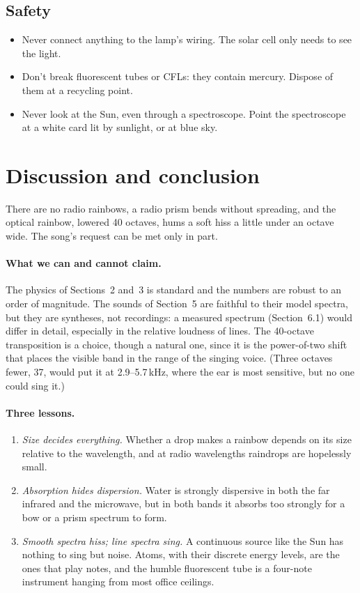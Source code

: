 \documentclass[11pt,a4paper]{article}
\begin{document}
\subsection{Safety}

\begin{itemize}
  \item Never connect anything to the lamp's wiring. The solar cell only needs to see the light.
  \item Don't break fluorescent tubes or CFLs: they contain mercury. Dispose of them at a recycling point.
  \item Never look at the Sun, even through a spectroscope. Point the spectroscope at a white card lit by sunlight, or at blue sky.
\end{itemize}

\section{Discussion and conclusion}

There are no radio rainbows, a radio prism bends without spreading, and the optical rainbow, lowered 40 octaves, hums a soft hiss a little under an octave wide. The song's request can be met only in part.

\paragraph{What we can and cannot claim.} The physics of Sections~2 and~3 is standard and the numbers are robust to an order of magnitude. The sounds of Section~5 are faithful to their model spectra, but they are syntheses, not recordings: a measured spectrum (Section~6.1) would differ in detail, especially in the relative loudness of lines. The 40-octave transposition is a choice, though a natural one, since it is the power-of-two shift that places the visible band in the range of the singing voice. (Three octaves fewer, 37, would put it at 2.9--5.7\,kHz, where the ear is most sensitive, but no one could sing it.)

\paragraph{Three lessons.}
\begin{enumerate}
  \item \emph{Size decides everything.} Whether a drop makes a rainbow depends on its size relative to the wavelength, and at radio wavelengths raindrops are hopelessly small.
  \item \emph{Absorption hides dispersion.} Water is strongly dispersive in both the far infrared and the microwave, but in both bands it absorbs too strongly for a bow or a prism spectrum to form.
  \item \emph{Smooth spectra hiss; line spectra sing.} A continuous source like the Sun has nothing to sing but noise. Atoms, with their discrete energy levels, are the ones that play notes, and the humble fluorescent tube is a four-note instrument hanging from most office ceilings.
\end{enumerate}
\end{document}
